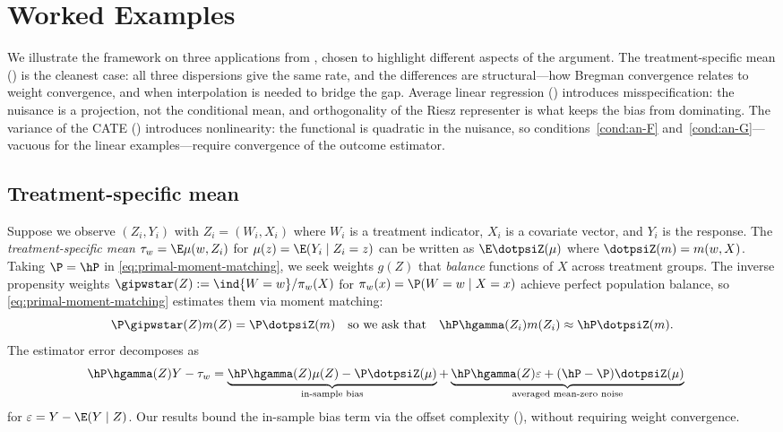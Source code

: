 \documentclass{article}
\begin{document}
\section{Worked Examples}
\label{sec:worked-examples}

We illustrate the framework on three applications
from ,
chosen to highlight different aspects
of the argument.
The treatment-specific mean ()
is the cleanest case:
all three dispersions give the same rate,
and the differences are structural---how
Bregman convergence relates to weight convergence,
and when interpolation is needed
to bridge the gap.
Average linear regression ()
introduces misspecification:
the nuisance is a projection,
not the conditional mean,
and orthogonality of the Riesz representer
is what keeps the bias from dominating.
The variance of the CATE ()
introduces nonlinearity:
the functional is quadratic in the nuisance,
so conditions~\ref{cond:an-F} and~\ref{cond:an-G}---vacuous
for the linear examples---require
convergence of the outcome estimator.

\subsection{Treatment-specific mean}
\label{sec:example-tsm}

Suppose we observe $(Z_i,Y_i)$ with $Z_i=(W_i,X_i)$ where $W_i$ is a treatment indicator, $X_i$ is a covariate vector, and $Y_i$ is the response. The \emph{treatment-specific mean} $\tau_w = \E \mu(w,Z_i)$ for $\mu(z)=\E(Y_i \mid Z_i=z)$ can be written as $\E \dotpsiZ(\mu)$ where $\dotpsiZ(m) = m(w, X)$. Taking $\P=\hP$ in \eqref{eq:primal-moment-matching}, we seek weights $g(Z)$ that \emph{balance} functions of $X$ across treatment groups. The inverse propensity weights $\gipwstar(Z) := \ind{W=w}/\pi_w(X)$ for $\pi_w(x) = \P(W=w \mid X=x)$ achieve perfect population balance, so \eqref{eq:primal-moment-matching} estimates them via moment matching:
\[
\P \gipwstar(Z)m(Z) = \P \dotpsiZ(m) \qqtext{so we ask that}
\hP \hgamma(Z_i)m(Z_i) \approx \hP \dotpsiZ(m).
\]
The estimator error decomposes as
\[
\begin{aligned}
\hP \hgamma(Z) Y - \tau_w
&= \underbrace{\hP \hgamma(Z)\mu(Z) - \P \dotpsiZ(\mu)}_{\text{in-sample bias}} + \underbrace{\hP \hgamma(Z)\varepsilon + (\hP-\P)\dotpsiZ(\mu)}_{\text{averaged mean-zero noise}}
\end{aligned}
\]
for $\varepsilon=Y - \E(Y \mid Z)$. Our results bound the in-sample bias term via the offset complexity (), without requiring weight convergence.
\end{document}
